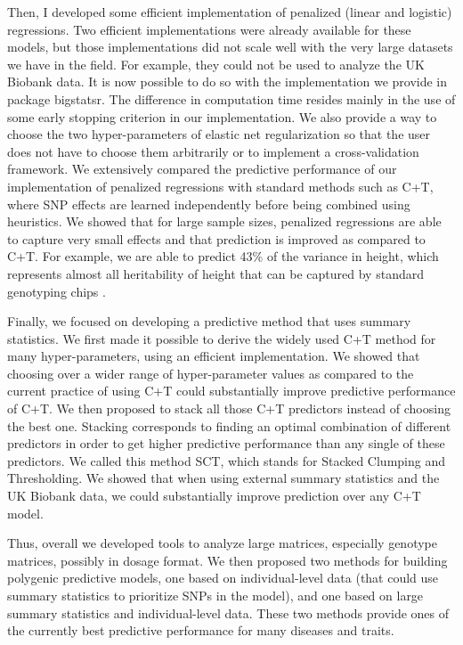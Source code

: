 Then, I developed some efficient implementation of penalized (linear and logistic) regressions. 
Two efficient implementations were already available for these models, but those implementations did not scale well with the very large datasets we have in the field. For example, they could not be used to analyze the UK Biobank data. 
It is now possible to do so with the implementation we provide in package bigstatsr. 
The difference in computation time resides mainly in the use of some early stopping criterion in our implementation. We also provide a way to choose the two hyper-parameters of elastic net regularization so that the user does not have to choose them arbitrarily or to implement a cross-validation framework.
We extensively compared the predictive performance of our implementation of penalized regressions with standard methods such as C+T, where SNP effects are learned independently before being combined using heuristics.
We showed that for large sample sizes, penalized regressions are able to capture very small effects and that prediction is improved as compared to C+T.
For example, we are able to predict 43\% of the variance in height, which represents almost all heritability of height that can be captured by standard genotyping chips \cite[]{yang2010common,accuheight2018}.  

Finally, we focused on developing a predictive method that uses summary statistics. We first made it possible to derive the widely used C+T method for many hyper-parameters, using an efficient implementation. 
We showed that choosing over a wider range of hyper-parameter values as compared to the current practice of using C+T could substantially improve predictive performance of C+T.
We then proposed to stack all those C+T predictors instead of choosing the best one. Stacking corresponds to finding an optimal combination of different predictors in order to get higher predictive performance than any single of these predictors. 
We called this method SCT, which stands for Stacked Clumping and Thresholding.
We showed that when using external summary statistics and the UK Biobank data, we could substantially improve prediction over any C+T model.

Thus, overall we developed tools to analyze large matrices, especially genotype matrices, possibly in dosage format.
We then proposed two methods for building polygenic predictive models, one based on individual-level data (that could use summary statistics to prioritize SNPs in the model), and one based on large summary statistics and individual-level data.
These two methods provide ones of the currently best predictive performance for many diseases and traits.   


